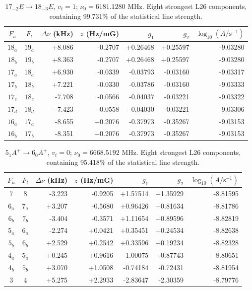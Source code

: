 \begin{table}[!htbp]
\centering\small\renewcommand{\arraystretch}{1.1}\setlength{\tabcolsep}{5pt}
\caption{$17_{-2} E\rightarrow 18_{-3} E$, $v_t=1$; $\nu_0=6181.1280$ MHz. Eight strongest L26 components, containing 99.731\% of the statistical line strength.}
\label{tab:sm-zeeman-6p18}
\begin{tabular}{ccrrrrr}
\hline\hline
$F_u$ & $F_l$ & $\Delta\nu$ (kHz) & $z$ (Hz/mG) & $g_1$ & $g_2$ & $\log_{10}(A/\mathrm{s}^{-1})$ \\
\hline
$18_{a}$ & $19_{a}$ & +8.086 & -0.2707 & +0.26468 & +0.25597 & -9.03280\\
$18_{b}$ & $19_{b}$ & +8.363 & -0.2707 & +0.26468 & +0.25597 & -9.03280\\
$17_{a}$ & $18_{a}$ & +6.930 & -0.0339 & -0.03793 & -0.03160 & -9.03317\\
$17_{b}$ & $18_{b}$ & +7.221 & -0.0330 & -0.03786 & -0.03160 & -9.03333\\
$17_{c}$ & $18_{c}$ & -7.708 & -0.0566 & -0.04037 & -0.03221 & -9.03322\\
$17_{d}$ & $18_{d}$ & -7.423 & -0.0558 & -0.04030 & -0.03221 & -9.03306\\
$16_{a}$ & $17_{a}$ & -8.655 & +0.2076 & -0.37973 & -0.35267 & -9.03153\\
$16_{b}$ & $17_{b}$ & -8.351 & +0.2076 & -0.37973 & -0.35267 & -9.03153\\
\hline\end{tabular}
\end{table}

\begin{table}[!htbp]
\centering\small\renewcommand{\arraystretch}{1.1}\setlength{\tabcolsep}{5pt}
\caption{$5_{1} A^{+}\rightarrow 6_{0} A^{+}$, $v_t=0$; $\nu_0=6668.5192$ MHz. Eight strongest L26 components, containing 95.418\% of the statistical line strength.}
\label{tab:sm-zeeman-6p7}
\begin{tabular}{ccrrrrr}
\hline\hline
$F_u$ & $F_l$ & $\Delta\nu$ (kHz) & $z$ (Hz/mG) & $g_1$ & $g_2$ & $\log_{10}(A/\mathrm{s}^{-1})$ \\
\hline
$7$ & $8$ & -3.223 & -0.9205 & +1.57514 & +1.35929 & -8.81595\\
$6_{a}$ & $7_{a}$ & +3.207 & -0.5680 & +0.96426 & +0.81634 & -8.81786\\
$6_{b}$ & $7_{b}$ & -3.404 & -0.3571 & +1.11654 & +0.89596 & -8.82819\\
$5_{a}$ & $6_{a}$ & -2.274 & +0.0421 & +0.35451 & +0.24534 & -8.82638\\
$5_{b}$ & $6_{b}$ & +2.529 & +0.2542 & +0.33596 & +0.19234 & -8.82328\\
$4_{a}$ & $5_{a}$ & +0.245 & +0.9616 & -1.00075 & -0.87743 & -8.80651\\
$4_{b}$ & $5_{b}$ & +3.070 & +1.0508 & -0.74184 & -0.72431 & -8.81954\\
$3$ & $4$ & +5.275 & +2.2933 & -2.83647 & -2.30359 & -8.79776\\
\hline\end{tabular}
\end{table}

